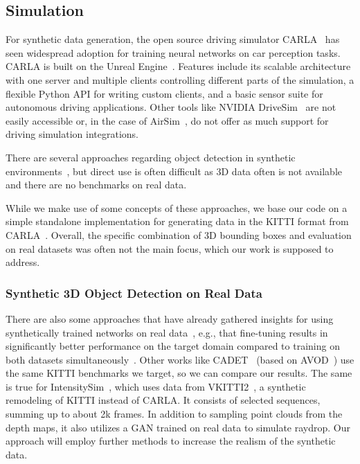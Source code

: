 \subsection{Simulation}
For synthetic data generation, the open source driving simulator CARLA~\cite{dosovitskiy_carla_2017} has seen widespread adoption for training neural networks on car perception tasks. CARLA is built on the Unreal Engine~\cite{epic_games_unreal_2019}. Features include its scalable architecture with one server and multiple clients controlling different parts of the simulation, a flexible Python API for writing custom clients, and a basic sensor suite for autonomous driving applications. Other tools like NVIDIA DriveSim~\cite{nvidia_drive_2024} are not easily accessible or, in the case of AirSim~\cite{shah_airsim_2017}, do not offer as much support for driving simulation integrations.

There are several approaches regarding object detection in synthetic environments~\cite{bavirisetti_simulated_2023,deschaud_paris-carla-3d_2021,patel_simulation-based_2024,sanchez_parisluco3d_2024,sekkat_amodalsynthdrive_2024}, but direct use is often difficult as 3D data often is not available and there are no benchmarks on real data.


While we make use of some concepts of these approaches, we base our code on a simple standalone implementation for generating data in the KITTI format from CARLA~\cite{nozarian_fnozariancarla-kitti_2024}. %
Overall, the specific combination of 3D bounding boxes and evaluation on real datasets was often not the main focus, which our work is supposed to address.

\subsubsection{Synthetic 3D Object Detection on Real Data}
There are also some approaches that have already gathered insights for using synthetically trained networks on real data~\cite{iglesias_analysis_2024}, e.g., that fine-tuning results in significantly better performance on the target domain compared to training on both datasets simultaneously~\cite{dworak_performance_2019}.
Other works like CADET~\cite{brekke_multimodal_2019} (based on AVOD~\cite{ku_joint_2018}) use the same KITTI benchmarks we target, so we can compare our results.
The same is true for IntensitySim~\cite{marcus_gan-based_2023}, which uses data from VKITTI2~\cite{gaidon_virtual_2016,cabon_virtual_2020}, a synthetic remodeling of KITTI instead of CARLA.
It consists of selected sequences, summing up to about 2k frames.
In addition to sampling point clouds from the depth maps, it also utilizes a GAN trained on real data to simulate raydrop.
Our approach will employ further methods to increase the realism of the synthetic data.